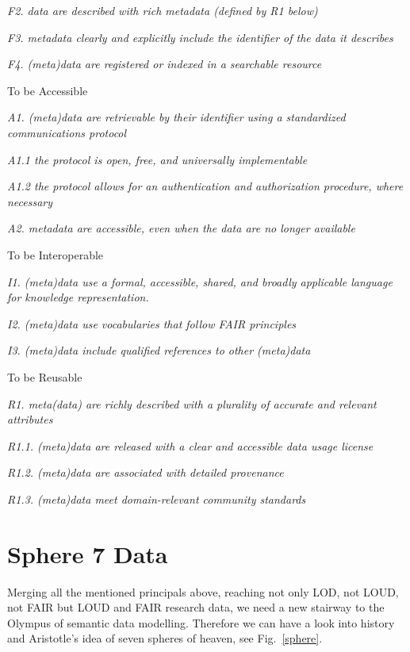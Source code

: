 \documentclass[twocolumn]{autart}
\begin{document}
\textit{F2. data are described with rich metadata (defined by R1 below)}

\textit{F3. metadata clearly and explicitly include the identifier of the data it describes}

\textit{F4. (meta)data are registered or indexed in a searchable resource}

To be Accessible

\textit{A1. (meta)data are retrievable by their identifier using a standardized communications protocol}

\textit{A1.1 the protocol is open, free, and universally implementable}

\textit{A1.2 the protocol allows for an authentication and authorization procedure, where necessary}

\textit{A2. metadata are accessible, even when the data are no longer available}

To be Interoperable

\textit{I1. (meta)data use a formal, accessible, shared, and broadly applicable language for knowledge representation.}

\textit{I2. (meta)data use vocabularies that follow FAIR principles}

\textit{I3. (meta)data include qualified references to other (meta)data}

To be Reusable

\textit{R1. meta(data) are richly described with a plurality of accurate and relevant attributes}

\textit{R1.1. (meta)data are released with a clear and accessible data usage license}

\textit{R1.2. (meta)data are associated with detailed provenance}

\textit{R1.3. (meta)data meet domain-relevant community standards}

\section{Sphere 7 Data}

Merging all the mentioned principals above, reaching not only LOD, not LOUD, not FAIR but LOUD and FAIR research data, we need a new stairway to the Olympus of semantic data modelling. Therefore we can have a look into history and Aristotle’s idea of seven spheres of heaven, see Fig.~\ref{sphere}.
\end{document}
